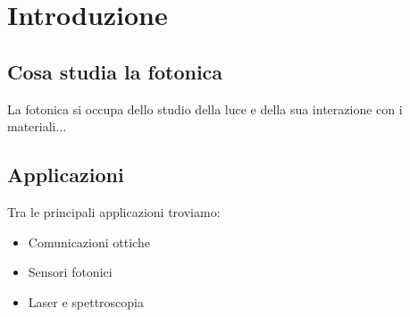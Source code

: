 \chapter{Introduzione}

\section{Cosa studia la fotonica}
La fotonica si occupa dello studio della luce e della sua interazione con i materiali...

\section{Applicazioni}
Tra le principali applicazioni troviamo:
\begin{itemize}
    \item Comunicazioni ottiche
    \item Sensori fotonici
    \item Laser e spettroscopia
\end{itemize}
